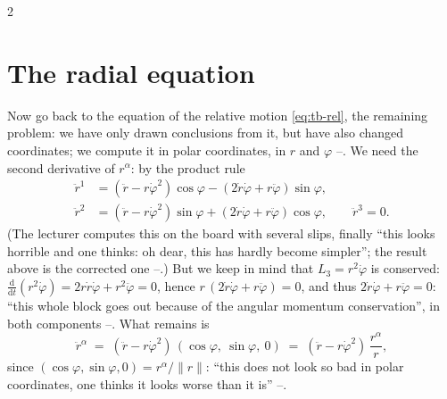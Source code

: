 \begin{paracol}{2}
\section{The radial equation}\label{sec:tb-radial}

Now go back to the equation of the relative motion \eqref{eq:tb-rel}, the remaining problem: we have only drawn conclusions from it, but have also changed coordinates; we compute it in polar coordinates, in $r$ and $\varphi$ --. We need the second derivative of $r^\alpha$: by the product rule
\begin{equation}\label{eq:tb-acc}
  \begin{aligned}
    \ddot r^1&=(\ddot r-r\dot\varphi^2)\cos\varphi-(2\dot r\dot\varphi+r\ddot\varphi)\sin\varphi,\\
    \ddot r^2&=(\ddot r-r\dot\varphi^2)\sin\varphi+(2\dot r\dot\varphi+r\ddot\varphi)\cos\varphi,\qquad \ddot r^3=0 .
  \end{aligned}
\end{equation}
(The lecturer computes this on the board with several slips, finally ``this looks horrible and one thinks: oh dear, this has hardly become simpler''; the result above is the corrected one --.)
But we keep in mind that $L_3=r^2\dot\varphi$ is conserved: $\frac{\mathrm d}{\mathrm dt}(r^2\dot\varphi)=2r\dot r\dot\varphi+r^2\ddot\varphi=0$, hence $r\,(2\dot r\dot\varphi+r\ddot\varphi)=0$, and thus $2\dot r\dot\varphi+r\ddot\varphi=0$: ``this whole block goes out because of the angular momentum conservation'', in both components --. What remains is
\begin{equation}\label{eq:tb-acc2}
  \ddot r^\alpha\;=\;(\ddot r-r\dot\varphi^2)\,(\cos\varphi,\ \sin\varphi,\ 0)\;=\;(\ddot r-r\dot\varphi^2)\,\frac{r^\alpha}{r} ,
\end{equation}
since $(\cos\varphi,\sin\varphi,0)=r^\alpha/\|r\|$: ``this does not look so bad in polar coordinates, one thinks it looks worse than it is'' --.


\end{paracol}
